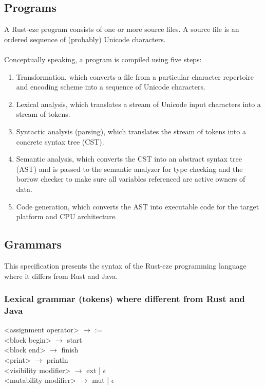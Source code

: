 \documentclass[letterpaper, 10pt, DIV=13]{scrartcl}
\numberwithin{equation}{section}
\numberwithin{figure}{section}
\numberwithin{table}{section}
\begin{document}
\subsection{Programs}
A Rust-eze program consists of one or more source files. A source file is an
ordered sequence of (probably) Unicode characters. 
\\ \\
Conceptually speaking, a program is compiled using five steps:
\begin{enumerate}
    \item Transformation, which converts a file from a particular character
          repertoire and encoding scheme into a sequence of Unicode characters.
    \item Lexical analysis, which translates a stream of Unicode input
          characters into a stream of tokens.
    \item Syntactic analysis (parsing), which translates the stream of tokens
          into a concrete syntax tree (CST).
    \item Semantic analysis, which converts the CST into an abstract syntax tree
          (AST) and is passed to the semantic analyzer for type checking and the 
          borrow checker to make sure all variables referenced are active owners
          of data.
    \item Code generation, which converts the AST into executable code for the
          target platform and CPU architecture.
\end{enumerate}
\subsection{Grammars}
This specification presents the syntax of the Rust-eze programming language
where it differs from Rust and Java.
\subsubsection{Lexical grammar (tokens) where different from Rust and Java}
<assignment operator> $\rightarrow$ := \\
<block begin> $\rightarrow$ start \\
<block end> $\rightarrow$ finish \\
<print> $\rightarrow$ println \\
<visibility modifier> $\rightarrow$ ext | $\epsilon$ \\
<mutability modifier> $\rightarrow$ mut | $\epsilon$ \\
\end{document}
